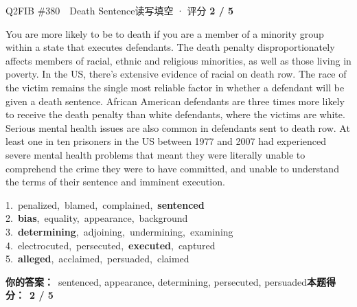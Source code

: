 \begin{qblock}{Q2\quad FIB \#380\ \ Death Sentence}{读写填空 · 评分 \textcolor{cAccent}{\bfseries 2 / 5}}
\begin{promptbox}
You are more likely to be  to death if you are a member of a minority group within a state that executes defendants. The death penalty disproportionately affects members of racial, ethnic and religious minorities, as well as those living in poverty. In the US, there's extensive evidence of racial  on death row. The race of the victim remains the single most reliable factor in  whether a defendant will be given a death sentence. African American defendants are three times more likely to receive the death penalty than white defendants, where the victims are white. Serious mental health issues are also common in defendants sent to death row. At least one in ten prisoners  in the US between 1977 and 2007 had experienced severe mental health problems that meant they were literally unable to comprehend the crime they were  to have committed, and unable to understand the terms of their sentence and imminent execution.
\end{promptbox}
{\small
1.\ penalized,\ blamed,\ complained,\ \textbf{sentenced}\\
2.\ \textbf{bias},\ equality,\ appearance,\ background\\
3.\ \textbf{determining},\ adjoining,\ undermining,\ examining\\
4.\ electrocuted,\ persecuted,\ \textbf{executed},\ captured\\
5.\ \textbf{alleged},\ acclaimed,\ persuaded,\ claimed}
\par\smallskip
\textbf{你的答案：}\ sentenced, {\color{cWrong}appearance}, determining, {\color{cWrong}persecuted, persuaded}\qquad\textbf{本题得分：}\ {\color{cAccent}\bfseries 2 / 5}
\end{qblock}

